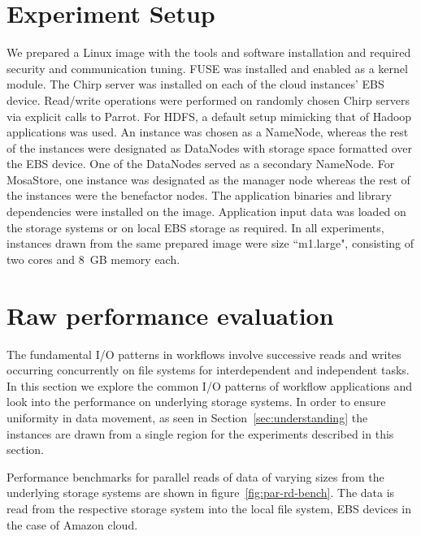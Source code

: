 \documentclass[10pt,journal,cspaper,compsoc]{IEEEtran}
\begin{document}
\section{Experiment Setup}\label{sec:expsetup}
We prepared a Linux image with the tools and software installation and required
security and communication tuning. FUSE was installed and enabled as a kernel
module.  The Chirp server was installed on each of the cloud instances' EBS
device.  Read/write operations were performed on randomly chosen Chirp servers
via explicit calls to Parrot. For HDFS, a default setup mimicking that of
Hadoop applications was used. An instance was chosen as a NameNode, whereas the
rest of the instances were designated as DataNodes with storage space formatted
over the EBS device. One of the DataNodes served as a secondary NameNode. For
MosaStore, one instance was designated as the manager node whereas the rest of
the instances were the benefactor nodes. The application binaries and library
dependencies were installed on the image.  Application input data was loaded on
the storage systems or on local EBS storage as required. In all experiments,
instances drawn from the same prepared image were size ``m1.large", consisting
of two cores and 8~GB memory each.

\section{Raw performance evaluation}\label{sec:perf}
The fundamental I/O patterns in workflows involve successive reads and writes
occurring concurrently on file systems for interdependent and independent
tasks. In this section we explore the common I/O patterns of workflow
applications and look into the performance on underlying storage systems. In order to
ensure uniformity in data movement, as seen in Section~\ref{sec:understanding}
the instances are drawn from a single region for the experiments described in
this section.

Performance benchmarks for parallel reads of data of varying sizes from the
underlying storage systems are shown in figure~\ref{fig:par-rd-bench}. The data
is read from the respective storage system into the local file system, EBS
devices in the case of Amazon cloud.
\end{document}
